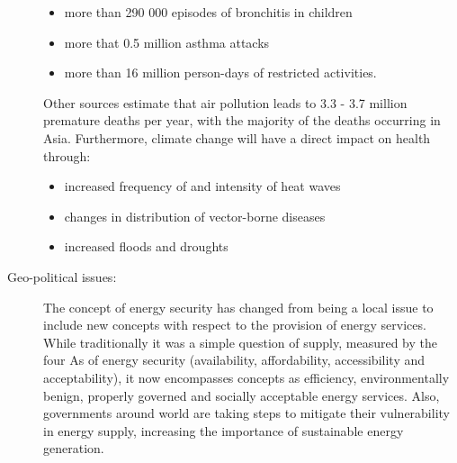 \begin{description}
\begin{itemize}
			\item more than 290 000 episodes of bronchitis in children
			\item more that 0.5 million asthma attacks
			\item more than 16 million person-days of restricted activities.
		\end{itemize} 
		Other sources estimate that air pollution leads to 3.3 - 3.7 million premature deaths per year, with the majority of the deaths occurring in Asia.
		Furthermore, climate change will have a direct impact on health through:
		\begin{itemize}
			\item increased frequency of and intensity of heat waves
			\item changes in distribution of vector-borne diseases
			\item increased floods and droughts
		\end{itemize}
	\item[Geo-political issues:] The concept of energy security has changed from being a local issue to include new concepts with respect to the provision of energy services. While traditionally it was a simple question of supply, measured by the four As of energy security (availability, affordability, accessibility and acceptability), it now encompasses concepts as efficiency, environmentally benign, properly governed and socially acceptable energy services. Also, governments around world are taking steps to mitigate their vulnerability in energy supply, increasing the importance of sustainable energy generation. 
\end{description}

